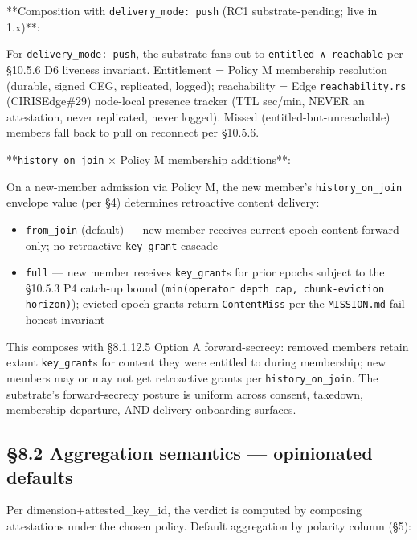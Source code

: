 \documentclass[10pt]{article}
\begin{document}
**Composition with \texttt{delivery\_mode: push} (RC1 substrate-pending; live in 1.x)**:


For \texttt{delivery\_mode: push}, the substrate fans out to \texttt{entitled ∧ reachable} per §10.5.6 D6 liveness invariant. Entitlement = Policy M membership resolution (durable, signed CEG, replicated, logged); reachability = Edge \texttt{reachability.rs} (CIRISEdge\#29) node-local presence tracker (TTL sec/min, NEVER an attestation, never replicated, never logged). Missed (entitled-but-unreachable) members fall back to pull on reconnect per §10.5.6.


**\texttt{history\_on\_join} × Policy M membership additions**:


On a new-member admission via Policy M, the new member's \texttt{history\_on\_join} envelope value (per §4) determines retroactive content delivery:


\begin{itemize}\setlength\itemsep{0pt}
\item \texttt{from\_join} (default) — new member receives current-epoch content forward only; no retroactive \texttt{key\_grant} cascade
\item \texttt{full} — new member receives \texttt{key\_grant}s for prior epochs subject to the §10.5.3 P4 catch-up bound (\texttt{min(operator depth cap, chunk-eviction horizon)}); evicted-epoch grants return \texttt{ContentMiss} per the \texttt{MISSION.md} fail-honest invariant
\end{itemize}


This composes with §8.1.12.5 Option A forward-secrecy: removed members retain extant \texttt{key\_grant}s for content they were entitled to during membership; new members may or may not get retroactive grants per \texttt{history\_on\_join}. The substrate's forward-secrecy posture is uniform across consent, takedown, membership-departure, AND delivery-onboarding surfaces.


\subsection*{§8.2 Aggregation semantics — opinionated defaults}


Per dimension+attested\_key\_id, the verdict is computed by composing attestations under the chosen policy. Default aggregation by polarity column (§5):
\end{document}
